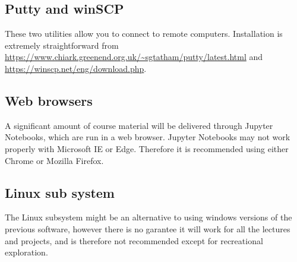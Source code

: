 \documentclass[11pt]{article}
\begin{document}
\subsection{Putty and winSCP}

These two utilities allow you to connect to remote computers. Installation is extremely straightforward from \url{https://www.chiark.greenend.org.uk/~sgtatham/putty/latest.html} and \url{https://winscp.net/eng/download.php}.

\subsection{Web browsers}

A significant amount of course material will be delivered through Jupyter Notebooks, which are run in a web browser. Jupyter Notebooks may not work properly with Microsoft IE or Edge. Therefore it is recommended using either Chrome or Mozilla Firefox.  

\subsection{Linux sub system}

The Linux subsystem might be an alternative to using windows versions of the previous software, however there is no garantee it will work for all the lectures and projects, and is therefore not recommended except for recreational exploration.
\end{document}
